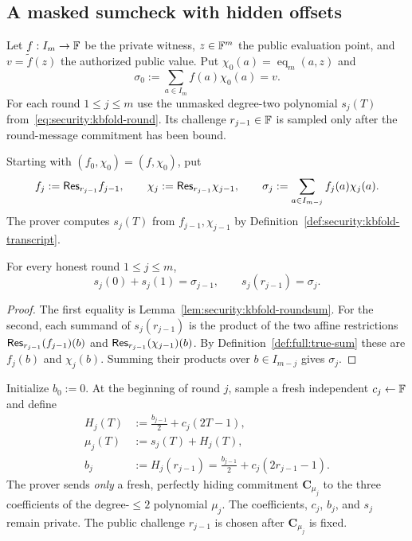 \subsection{A masked sumcheck with hidden offsets}\label{sec:full:sumcheck}

Let $f:I_m\to\mathbb{F}$ be the private witness,
$z\in\mathbb{F}^m$ the public evaluation point,
and $v=\widetilde f(z)$ the authorized public
value. Put $\chi_0(a)=\operatorname{eq}_m(a,z)$
and
\[
 \sigma_0:=\sum_{a\in I_m}f(a)\chi_0(a)=v.
\]
For each round $1\le j\le m$ use the
unmasked degree-two polynomial $s_j(T)$
from~\eqref{eq:security:kbfold-round}.
Its challenge $r_{j-1}\in\mathbb{F}$ is sampled
only after the round-message commitment
has been bound.

\begin{definition}\label{def:full:true-sum}
Starting with $(f_0,\chi_0)=(f,\chi_0)$,
put
\[
 f_j:=\mathsf{Res}_{r_{j-1}}f_{j-1},\qquad
 \chi_j:=\mathsf{Res}_{r_{j-1}}\chi_{j-1},
 \qquad
 \sigma_j:=\sum_{a\in I_{m-j}}f_j(a)\chi_j(a).
\]
The prover computes $s_j(T)$ from
$f_{j-1},\chi_{j-1}$ by
Definition~\ref{def:security:kbfold-transcript}.
\end{definition}

\begin{lemma}\label{lem:full:true-transition}
For every honest round $1\le j\le m$,
\[
 \boxed{
 s_j(0)+s_j(1)=\sigma_{j-1},\qquad
 s_j(r_{j-1})=\sigma_j.}
\]
\end{lemma}
\begin{proof}
The first equality is
Lemma~\ref{lem:security:kbfold-roundsum}.
For the second, each summand of
$s_j(r_{j-1})$ is the product of the
two affine restrictions
$\mathsf{Res}_{r_{j-1}}(f_{j-1})(b)$
and $\mathsf{Res}_{r_{j-1}}(\chi_{j-1})(b)$.
By Definition~\ref{def:full:true-sum}
these are $f_j(b)$ and $\chi_j(b)$.
Summing their products over
$b\in I_{m-j}$ gives $\sigma_j$.
\end{proof}

\begin{definition}\label{def:full:masked-round}
Initialize $b_0:=0$. At the beginning
of round $j$, sample a fresh independent
$c_j\leftarrow\mathbb{F}$ and define
\[
 \begin{aligned}
 H_j(T)&:=\frac{b_{j-1}}{2}
              +c_j(2T-1),\\
 \mu_j(T)&:=s_j(T)+H_j(T),\\
 b_j&:=H_j(r_{j-1})
       =\frac{b_{j-1}}{2}
               +c_j(2r_{j-1}-1).
 \end{aligned}
\]
The prover sends \emph{only} a fresh,
perfectly hiding commitment
$\mathbf C_{\mu_j}$ to the three
coefficients of the degree-$\le2$
polynomial $\mu_j$. The coefficients,
$c_j$, $b_j$, and $s_j$ remain private.
The public challenge $r_{j-1}$ is
chosen after $\mathbf C_{\mu_j}$
is fixed.
\end{definition}

